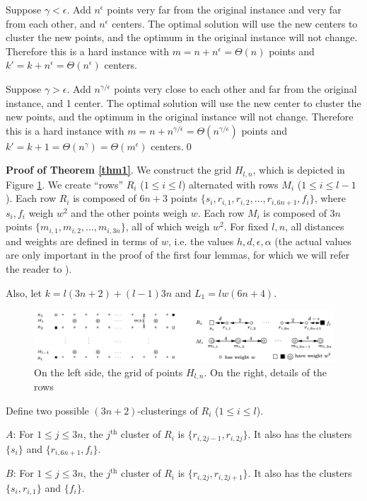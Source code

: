 Suppose $\gamma<\epsilon$. Add $n^\epsilon$ points very far from the original instance and very far from each other, and $n^\epsilon$ centers. The optimal solution will use the new centers to cluster the new points, and the optimum in the original instance will not change. Therefore this is a hard instance with $m = n+n^\epsilon=\Theta(n)$ points and $k'= k+n^\epsilon=\Theta(n^\epsilon)$ centers.

Suppose $\gamma>\epsilon$. Add $n^{\gamma/\epsilon}$ points very close to each other and far from the original instance, and 1 center. The optimal solution will use the new center to cluster the new points, and the optimum in the original instance will not change. Therefore this is a hard instance with $m= n+n^{\gamma/\epsilon}=\Theta(n^{\gamma/\epsilon})$ points and $k'= k+1=\Theta(n^\gamma)=\Theta(m^\epsilon)$ centers.\qed

\textbf{Proof of Theorem \ref{thm1}}. We construct the grid $H_{l,n}$, which is depicted in Figure \ref{fig:vattani1}. We create ``rows'' $R_i$ ($1\le i \le l$) alternated with rows $M_i$ ($1\le i \le l-1$). Each row $R_i$ is composed of $6n+3$ points $\{s_i,r_{i,1},r_{i,2},\dots,r_{i,6n+1},f_i\}$, where $s_i,f_i$ weigh $w^2$ and the other points weigh $w$. Each row $M_i$ is composed of $3n$ points $\{m_{i,1},m_{i,2},\dots,m_{i,3n}\}$, all of which weigh $w^2$. For fixed $l,n$, all distances and weights are defined in terms of $w$, i.e. the values $h,d,\epsilon,\alpha$ (the actual values are only important in the proof of the first four lemmas, for which we will refer the reader to \cite{vattani}).

Also, let $k=l(3n+2)+(l-1)3n$ and $L_1=lw(6n+4)$.

\begin{figure}
    \centering
    \includegraphics[width=15cm]{chapter_1/files/vattani_fig1.png}
\centering
    \caption{On the left side, the grid of points $H_{l,n}$. On the right, details of the rows \cite{vattani}}
    \label{fig:vattani1}
\end{figure}

\begin{definition}\label{def1}
Define two possible $(3n+2)$-clusterings of $R_i$ ($1\le i \le l$).

$A$: For $1\le j \le 3n$, the $j^{\text{th}}$ cluster of $R_i$ is $\{r_{i,2j-1},r_{i,2j}\}$. It also has the clusters $\{s_i\}$ and $\{r_{i,6n+1},f_i\}$.

$B$: For $1\le j \le 3n$, the $j^{\text{th}}$ cluster of $R_i$ is $\{r_{i,2j},r_{i,2j+1}\}$. It also has the clusters $\{s_i,r_{i,1}\}$ and $\{f_i\}$.
\end{definition}

